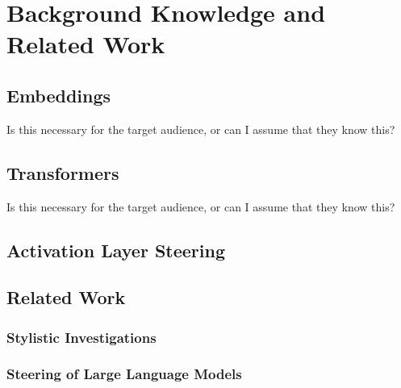 \chapter{Background Knowledge and Related Work}
\label{sec:relatedWork_backgroundKnowledge}
\section{Embeddings}
\label{sec:relatedWork_backgroundKnowledge:embeddings}
Is this necessary for the target audience, or can I assume that they know this?


\section{Transformers}
\label{sec:relatedWork_backgroundKnowledge:transformers}
Is this necessary for the target audience, or can I assume that they know this?


\section{Activation Layer Steering}
\label{sec:relatedWork_backgroundKnowledge:activation}


\section{Related Work}


\subsection{Stylistic Investigations} %


\subsection{Steering of Large Language Models}